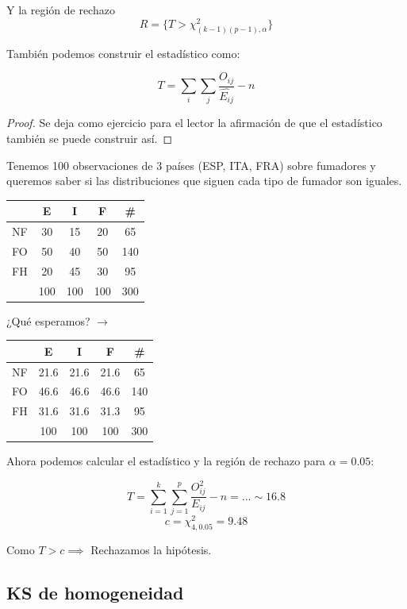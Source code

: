 \begin{enumerate}
Y la región de rechazo \[R = \{T>\chi^2_{(k-1)(p-1),α}\}\]

\obs También podemos construir el estadístico como:

\[
T = \sum_{i}\sum_j \frac{O_{ij}}{\hat{E_{ij}}} - n
\]

\begin{proof}
Se deja como ejercicio para el lector la afirmación de que el estadístico también se puede construir así.
\end{proof}
\end{enumerate}


\begin{example}

Tenemos 100 observaciones de 3 países (ESP, ITA, FRA) sobre fumadores y queremos saber si las distribuciones que siguen cada tipo de fumador son iguales.

\begin{center}


\begin{tabular}{c|ccc|c}
 & E & I & F & \#\\\hline
NF&30&15&20&65\\
FO&50&40&50&140\\
FH&20&45&30&95\\\hline
&100 & 100 & 100 & 300
\end{tabular}
¿Qué esperamos? $\to$
\begin{tabular}{c|ccc|c}
 & E & I & F & \#\\\hline
NF & 21.6 & 21.6 & 21.6 & 65 \\
FO & 46.6 & 46.6 & 46.6 & 140 \\
FH & 31.6 & 31.6 & 31.3 & 95 \\
\hline
&100 & 100 & 100 & 300
\end{tabular}
\end{center}

Ahora podemos calcular el estadístico y la región de rechazo para $α=0.05$:

\[ T = \sum_{i=1}^k \sum_{j=1}^p \frac{O_{ij}^2}{E_{ij}} -n = ... \sim 16.8\]
\[ c = \chi^2_{4,0.05} = 9.48\]

Como $T > c \implies $ Rechazamos la hipótesis.

\end{example}

\subsection{KS de homogeneidad}

